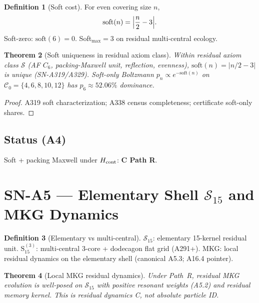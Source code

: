 \documentclass[11pt,a4paper]{article}
\newtheorem{theorem}{Theorem}[section]
\theoremstyle{definition}
\newtheorem{definition}[theorem]{Definition}
\begin{document}
\begin{definition}[Soft cost]
\label{def:A4-soft}
For even covering size $n$,
\begin{equation}
\mathrm{soft}(n)=\Bigl|\frac{n}{2}-3\Bigr|.
\end{equation}
Soft-zero: $\mathrm{soft}(6)=0$. Soft$_{\max}=3$ on residual multi-central ecology.
\end{definition}

\begin{theorem}[Soft uniqueness in residual axiom class]
\label{thm:A4}
Within residual axiom class $\mathcal{S}$ (AF $C_6$, packing-Maxwell unit, reflection, evenness),
$\mathrm{soft}(n)=|n/2-3|$ is unique (SN-A319/A329). Soft-only Boltzmann
$p_n\propto e^{-\mathrm{soft}(n)}$ on $\mathcal{C}_0=\{4,6,8,10,12\}$ has $p_6\approx 52.06\%$ dominance.
\end{theorem}

\begin{proof}
A319 soft characterization; A338 census completeness; certificate soft-only shares.
\end{proof}

\subsection*{Status (A4)} Soft + packing Maxwell under $H_{\rm cont}$: \textbf{C Path R}.

\section{SN-A5 --- Elementary Shell $\mathcal{S}_{15}$ and MKG Dynamics}
\label{sec:SNA5}

\begin{definition}[Elementary vs multi-central]
\label{def:A5-names}
$\mathcal{S}_{15}$: elementary 15-kernel residual unit.
$\mathrm{S}_{15}^{(3)}$: multi-central 3-core + dodecagon flat grid (A291+).
MKG: local residual dynamics on the elementary shell (canonical A5.3; A16.4 pointer).
\end{definition}

\begin{theorem}[Local MKG residual dynamics]
\label{thm:A5}
Under Path~R, residual MKG evolution is well-posed on $\mathcal{S}_{15}$ with positive resonant weights
(A5.2) and residual memory kernel. This is residual dynamics C, not absolute particle ID.
\end{theorem}
\end{document}
